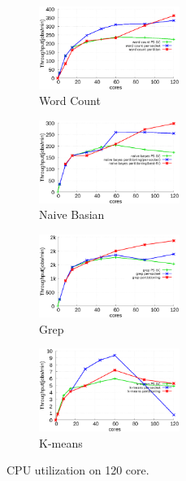 \begin{figure}[tb]
    \centering
    \begin{subfigure}[b]{0.25\textwidth}
        \includegraphics[width=1.8in]{graph/wc_docker.eps}
        \caption{Word Count}
    \end{subfigure}%
    \begin{subfigure}[b]{0.25\textwidth}
        \includegraphics[width=1.8in]{graph/nb_docker.eps}
        \caption{Naive Basian}
    \end{subfigure}%
    \begin{subfigure}[b]{0.25\textwidth}
        \includegraphics[width=1.8in]{graph/grep_docker.eps}
        \caption{Grep}
    \end{subfigure}%
    \begin{subfigure}[b]{0.25\textwidth}
        \includegraphics[width=1.8in]{graph/kmeans_docker.eps}
        \caption{K-means}
    \end{subfigure}%
    \caption{CPU utilization on 120 core.}
    \label{fig:docker}
\end{figure}


